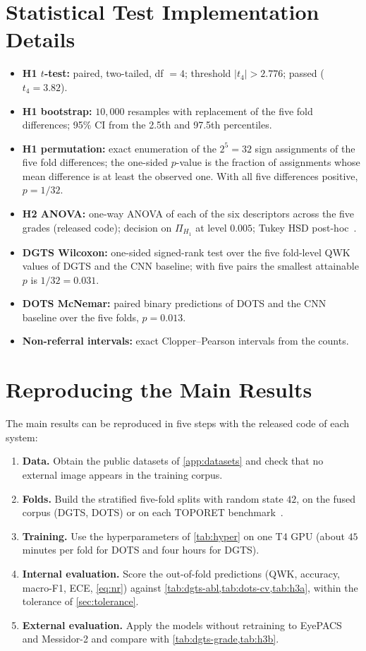 \section{Statistical Test Implementation Details}
\label{sec:testimpl}
\begin{itemize}
\item \textbf{H1 $t$-test:} paired, two-tailed, df $=4$; threshold $|t_4|>2.776$; passed
($t_4=3.82$).
\item \textbf{H1 bootstrap:} $10{,}000$ resamples with replacement of the five fold
differences; 95\% CI from the 2.5th and 97.5th percentiles.
\item \textbf{H1 permutation:} exact enumeration of the $2^5=32$ sign assignments of the
five fold differences; the one-sided $p$-value is the fraction of assignments whose mean
difference is at least the observed one. With all five differences positive, $p=1/32$.
\item \textbf{H2 ANOVA:} one-way ANOVA of each of the six descriptors across the five grades
(released code); decision on $\Pi_{H_1}$ at level $0.005$; Tukey HSD post-hoc~\cite{belhadj2025plos}.
\item \textbf{DGTS Wilcoxon:} one-sided signed-rank test over the five fold-level QWK values
of DGTS and the CNN baseline; with five pairs the smallest attainable $p$ is $1/32=0.031$.
\item \textbf{DOTS McNemar:} paired binary predictions of DOTS and the CNN baseline over the
five folds, $p=0.013$.
\item \textbf{Non-referral intervals:} exact Clopper--Pearson intervals from the counts.
\end{itemize}

\section{Reproducing the Main Results}
The main results can be reproduced in five steps with the released code of each system:
\begin{enumerate}[leftmargin=1.6em,itemsep=1pt]
\item \textbf{Data.} Obtain the public datasets of \cref{app:datasets} and check that no
external image appears in the training corpus.
\item \textbf{Folds.} Build the stratified five-fold splits with random state $42$, on the
fused corpus (DGTS, DOTS) or on each TOPORET benchmark~\cite{belhadj2025plos}.
\item \textbf{Training.} Use the hyperparameters of \cref{tab:hyper} on one T4 GPU (about
$45$ minutes per fold for DOTS and four hours for DGTS).
\item \textbf{Internal evaluation.} Score the out-of-fold predictions (QWK, accuracy,
macro-F1, ECE, \cref{eq:nr}) against \cref{tab:dgts-abl,tab:dots-cv,tab:h3a}, within the
tolerance of \cref{sec:tolerance}.
\item \textbf{External evaluation.} Apply the models without retraining to EyePACS and
Messidor-2 and compare with \cref{tab:dgts-grade,tab:h3b}.
\end{enumerate}
